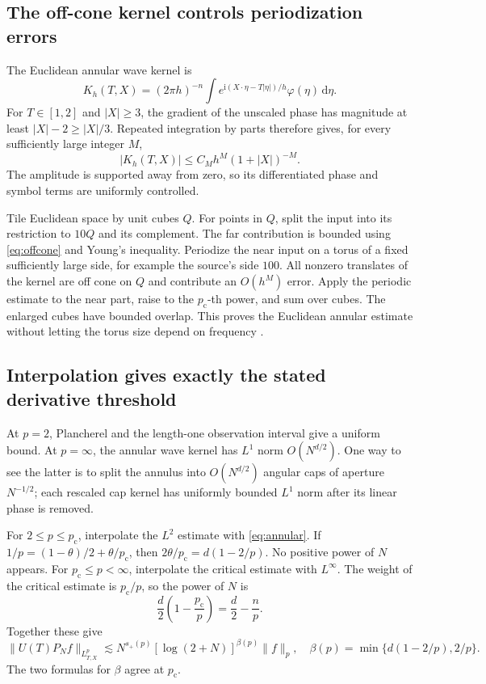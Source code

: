 \documentclass[11pt,a4paper]{article}
\numberwithin{equation}{section}
\theoremstyle{definition}
\theoremstyle{remark}
\newcommand{\dd}{\,\mathrm d}
\newcommand{\pc}{p_{\mathrm c}}
\begin{document}
\subsection{The off-cone kernel controls periodization errors}
The Euclidean annular wave kernel is
\[
 K_h(T,X)=(2\pi h)^{-n}\int
 e^{\mathrm i(X\cdot\eta-T|\eta|)/h}\varphi(\eta)\dd\eta.
\]
For $T\in[1,2]$ and $|X|\ge3$, the gradient of the unscaled phase has magnitude
at least $|X|-2\ge|X|/3$. Repeated integration by parts therefore gives, for
every sufficiently large integer $M$,
\begin{equation}\label{eq:offcone}
 |K_h(T,X)|\le C_Mh^M(1+|X|)^{-M}.
\end{equation}
The amplitude is supported away from zero, so its differentiated phase and
symbol terms are uniformly controlled.

Tile Euclidean space by unit cubes $Q$. For points in $Q$, split the input
into its restriction to $10Q$ and its complement. The far contribution is
bounded using \eqref{eq:offcone} and Young's inequality. Periodize the near
input on a torus of a fixed sufficiently large side, for example the source's
side $100$. All nonzero translates of the kernel are off cone on $Q$ and
contribute an $O(h^M)$ error. Apply the periodic estimate to the near part,
raise to the $\pc$-th power, and sum over cubes. The enlarged cubes have
bounded overlap. This proves the Euclidean annular estimate without letting
the torus size depend on frequency \cite{transfer}.

\subsection{Interpolation gives exactly the stated derivative threshold}
At $p=2$, Plancherel and the length-one observation interval give a uniform
bound. At $p=\infty$, the annular wave kernel has $L^1$ norm $O(N^{d/2})$.
One way to see the latter is to split the annulus into $O(N^{d/2})$ angular
caps of aperture $N^{-1/2}$; each rescaled cap kernel has uniformly bounded
$L^1$ norm after its linear phase is removed.

For $2\le p\le\pc$, interpolate the $L^2$ estimate with
\eqref{eq:annular}. If $1/p=(1-\theta)/2+\theta/\pc$, then
$2\theta/\pc=d(1-2/p)$. No positive power of $N$ appears.
For $\pc\le p<\infty$, interpolate the critical estimate with $L^\infty$.
The weight of the critical estimate is $\pc/p$, so the power of $N$ is
\[
 \frac d2\left(1-\frac{\pc}{p}\right)=\frac d2-\frac np.
\]
Together these give
\begin{equation}\label{eq:allp}
 \|U(T)P_Nf\|_{L^p_{T,X}}
 \lesssim N^{s_+(p)}[\log(2+N)]^{\beta(p)}\|f\|_p,
 \quad
 \beta(p)=\min\{d(1-2/p),2/p\}.
\end{equation}
The two formulas for $\beta$ agree at $\pc$.
\end{document}

